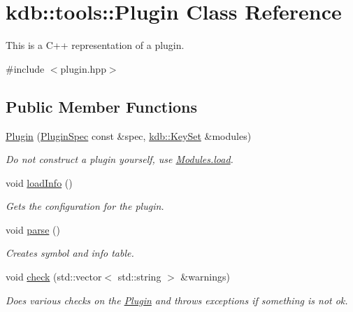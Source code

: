 \hypertarget{classkdb_1_1tools_1_1Plugin}{}\section{kdb\+::tools\+::Plugin Class Reference}
\label{classkdb_1_1tools_1_1Plugin}


This is a C++ representation of a plugin.  




{\ttfamily \#include $<$plugin.\+hpp$>$}

\subsection*{Public Member Functions}
\begin{DoxyCompactItemize}
\item 
\mbox{\label{classkdb_1_1tools_1_1Plugin_a8fdab835766bab1d1a992731c6863b9f}} 
\mbox{\hyperlink{classkdb_1_1tools_1_1Plugin_a8fdab835766bab1d1a992731c6863b9f}{Plugin}} (\mbox{\hyperlink{classkdb_1_1tools_1_1PluginSpec}{Plugin\+Spec}} const \&spec, \mbox{\hyperlink{classkdb_1_1KeySet}{kdb\+::\+Key\+Set}} \&modules)
\begin{DoxyCompactList}\small\item\em Do not construct a plugin yourself, use \mbox{\hyperlink{classkdb_1_1tools_1_1Modules_ae8d8c91745c9f517e6e8a556f1664f69}{Modules.\+load}}. \end{DoxyCompactList}\item 
void \mbox{\hyperlink{classkdb_1_1tools_1_1Plugin_a3a0c6a956d1714002ef9baf8c9d99167}{load\+Info}} ()
\begin{DoxyCompactList}\small\item\em Gets the configuration for the plugin. \end{DoxyCompactList}\item 
void \mbox{\hyperlink{classkdb_1_1tools_1_1Plugin_adfcba2fbdeb436a1083410df804d5fb0}{parse}} ()
\begin{DoxyCompactList}\small\item\em Creates symbol and info table. \end{DoxyCompactList}\item 
void \mbox{\hyperlink{classkdb_1_1tools_1_1Plugin_a5bb3db65b9d87d18787da8cc65eaca65}{check}} (std\+::vector$<$ std\+::string $>$ \&warnings)
\begin{DoxyCompactList}\small\item\em Does various checks on the \mbox{\hyperlink{classkdb_1_1tools_1_1Plugin}{Plugin}} and throws exceptions if something is not ok. \end{DoxyCompactList}\item 

\end{DoxyCompactItemize}
